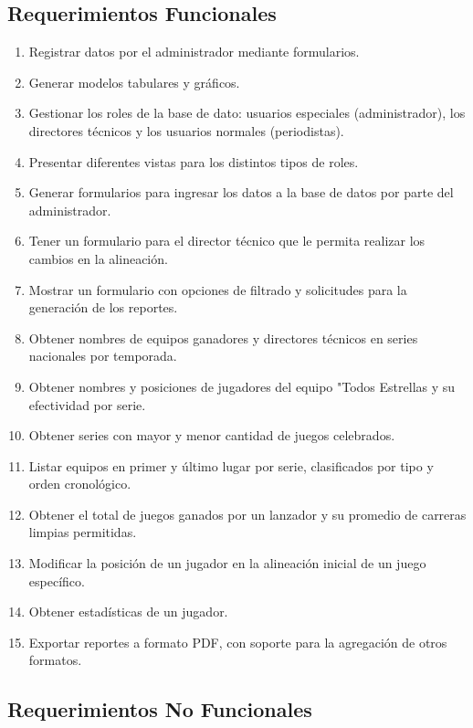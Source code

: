 \documentclass{report}
\begin{document}
    \subsection*{Requerimientos Funcionales}
    \begin{enumerate}
        \item Registrar datos por el administrador mediante formularios.
        \item Generar modelos tabulares y gr\'aficos.
        \item Gestionar los roles de la base de dato: usuarios especiales (administrador), los directores técnicos y 
        los usuarios normales (periodistas).
        \item Presentar diferentes vistas para los distintos tipos de roles.
        \item Generar formularios para ingresar los datos a la base de datos por parte del administrador.
        \item Tener un formulario para el director técnico que le permita realizar los cambios en la alineación.
        \item Mostrar un formulario con opciones de filtrado y solicitudes para la generaci\'on de los reportes.
        \item Obtener nombres de equipos ganadores y directores técnicos en series nacionales por temporada.
        \item Obtener nombres y posiciones de jugadores del equipo "Todos Estrellas y su efectividad por serie.
        \item Obtener series con mayor y menor cantidad de juegos celebrados.
        \item Listar equipos en primer y último lugar por serie, clasificados por tipo y orden cronológico.
        \item Obtener el total de juegos ganados por un lanzador y su promedio de carreras limpias permitidas.
        \item Modificar la posición de un jugador en la alineación inicial de un juego específico.
        \item Obtener estadísticas de un jugador.
        \item Exportar reportes a formato PDF, con soporte para la agregación de otros formatos.
    \end{enumerate}

    \subsection*{Requerimientos No Funcionales}
\end{document}
